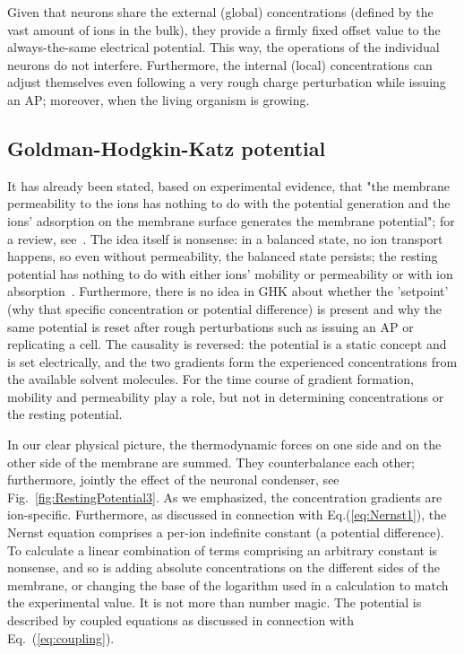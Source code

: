 Given that neurons share the external (global) concentrations (defined by the vast amount of ions in the bulk), they provide a firmly fixed offset value to the always-the-same electrical potential. This way, the operations of the individual neurons do not interfere. Furthermore, the internal (local) concentrations can adjust themselves even following a very rough charge perturbation
while issuing an \gls{AP}; moreover, when the living organism is growing.

\subsection{Goldman-Hodgkin-Katz potential\label{sec:Goldman-Hodgkin-Katz}}


It has already been stated, based on experimental evidence, that "the membrane permeability to the ions has nothing to do with the potential generation and the ions' adsorption on the membrane surface generates the membrane potential"; for a review, see~\cite{MembranePotentialPermeability:2024}.
The idea itself is nonsense: in a balanced state, no ion transport happens, so even without permeability, the balanced state persists;  the resting potential has nothing to do with either ions' mobility or permeability or with ion absorption~\cite{Hodgkin-HuxleyAdsorption:2021}.
Furthermore, there is no idea in \gls{GHK} about whether the 'setpoint' (why that specific concentration or potential difference) is present and why the same potential is reset after rough perturbations such as issuing an \gls{AP} or replicating a cell.
The causality is reversed: the potential is a static concept and is set electrically, and
the two gradients form the experienced concentrations from the available solvent molecules.
For the time course of gradient formation, mobility and permeability play a role, but not in determining concentrations or the resting potential.

In our clear physical picture, the thermodynamic forces on one side
and on the other side of the membrane are summed. They counterbalance each other; furthermore, jointly the effect of the neuronal condenser, see  Fig.~\ref{fig:RestingPotential3}.
As we emphasized, the concentration gradients are ion-specific.
Furthermore, as discussed in connection with Eq.(\ref{eq:Nernst1}), the Nernst equation comprises a per-ion indefinite constant (a potential difference).
To calculate a linear combination of terms comprising an arbitrary constant is nonsense,
and so is adding absolute concentrations on the different sides of the membrane, or changing the base of the logarithm used in a calculation to match
the experimental value. It is not more than number magic. The potential is described by coupled equations as discussed in connection with Eq.~(\ref{eq:coupling}).

